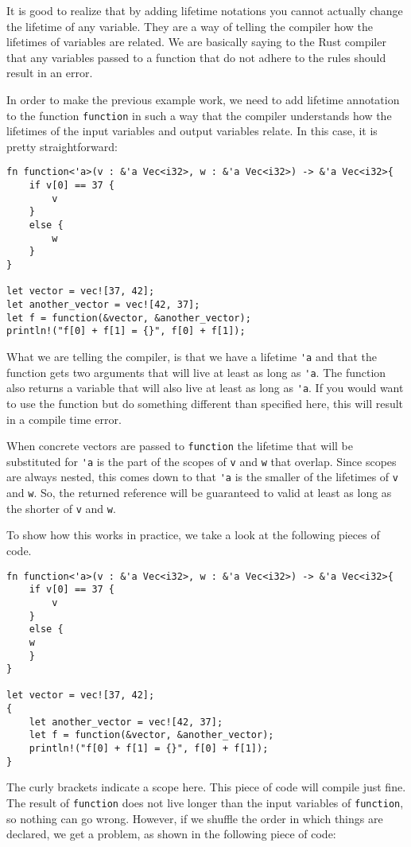 It is good to realize that by adding lifetime notations you cannot actually change the lifetime of any variable. They are a way of telling the compiler how the lifetimes of variables are related. We are basically saying to the Rust compiler that any variables passed to a function that do not adhere to the rules should result in an error. 

In order to make the previous example work, we need to add lifetime annotation to the function \verb|function| in such a way that the compiler understands how the lifetimes of the input variables and output variables relate. In this case, it is pretty straightforward: 

\begin{verbatim}
fn function<'a>(v : &'a Vec<i32>, w : &'a Vec<i32>) -> &'a Vec<i32>{
    if v[0] == 37 {
        v
    }
    else {
        w
    }
}

let vector = vec![37, 42];
let another_vector = vec![42, 37];
let f = function(&vector, &another_vector);
println!("f[0] + f[1] = {}", f[0] + f[1]);
\end{verbatim}

What we are telling the compiler, is that we have a lifetime \verb|'a| and that the function gets two arguments that will live at least as long as \verb|'a|. The function also returns a variable that will also live at least as long as \verb|'a|. If you would want to use the function but do something different than specified here, this will result in a compile time error. 

When concrete vectors are passed to \verb|function| the lifetime that will be substituted for \verb|'a| is the part of the scopes of \verb|v| and \verb|w| that overlap. Since scopes are always nested, this comes down to that \verb|'a| is the smaller of the lifetimes of \verb|v| and \verb|w|. So, the returned reference will be guaranteed to valid at least as long as the shorter of \verb|v| and \verb|w|.

To show how this works in practice, we take a look at the following pieces of code. 

\begin{verbatim}
fn function<'a>(v : &'a Vec<i32>, w : &'a Vec<i32>) -> &'a Vec<i32>{
    if v[0] == 37 {
        v
    }
    else {
    w
    }
}

let vector = vec![37, 42];
{
    let another_vector = vec![42, 37];
    let f = function(&vector, &another_vector);
    println!("f[0] + f[1] = {}", f[0] + f[1]);
}
\end{verbatim}
The curly brackets indicate a scope here. This piece of code will compile just fine. The result of \verb|function| does not live longer than the input variables of \verb|function|, so nothing can go wrong. However, if we shuffle the order in which things are declared, we get a problem, as shown in the following piece of code: 

